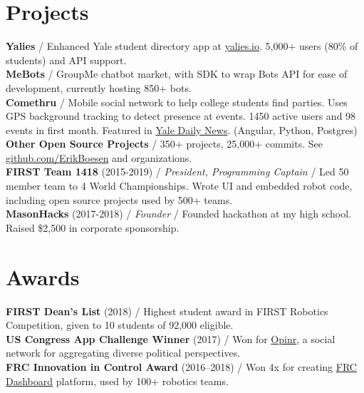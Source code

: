 \documentclass[10pt, a4paper]{article}
\newcommand{\years}[1]{\marginnote{\scriptsize #1}}
\begin{document}
\section*{Projects}
\textbf{Yalies} / Enhanced Yale student directory app at \href{https://yalies.io}{yalies.io}. 5,000+ users (80\% of students) and API support.\\
\textbf{MeBots} / GroupMe chatbot market, with SDK to wrap Bots API for ease of development, currently hosting 850+ bots.\\
\textbf{Comethru} / Mobile social network to help college students find parties. Uses GPS background tracking to detect presence at events. 1450 active users and 98 events in first month. Featured in \href{https://yaledailynews.com/blog/2020/01/22/new-events-app-comethru-launches}{Yale Daily News}. (Angular, Python, Postgres)\\
\textbf{Other Open Source Projects} / 350+ projects, 25,000+ commits. See \href{https://github.com/ErikBoesen}{github.com/ErikBoesen} and organizations.\\
\textbf{FIRST Team 1418} (2015-2019) / \textit{President, Programming Captain} / Led 50 member team to 4 World Championships. Wrote UI and embedded robot code, including open source projects used by 500+ teams.\\
\textbf{MasonHacks} (2017-2018) / \textit{Founder} / Founded hackathon at my high school. Raised \$2,500 in corporate sponsorship.\\

\vspace{-7mm}
\section*{Awards}
\textbf{FIRST Dean's List} (2018) / Highest student award in FIRST Robotics Competition, given to 10 students of 92,000 eligible.\\
\textbf{US Congress App Challenge Winner} (2017) / Won for \href{http://opinr.me}{Opinr}, a social network for aggregating diverse political perspectives.\\
\textbf{FRC Innovation in Control Award} (2016--2018) / Won 4x for creating \href{https://frcdashboard.github.io}{FRC Dashboard} platform, used by 100+ robotics teams.\\
\end{document}

